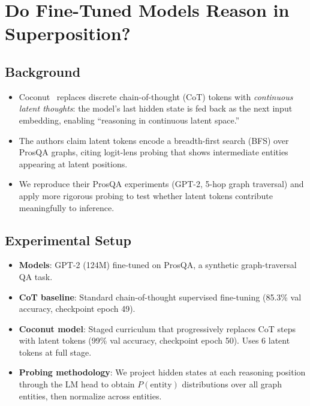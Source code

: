 
\section{Do Fine-Tuned Models Reason in Superposition?}
\label{sec:coconut}

\subsection{Background}
\label{sec:coconut-background}

\begin{itemize}
    \item Coconut~\cite{hao2024coconut} replaces discrete chain-of-thought (CoT) tokens with \emph{continuous latent thoughts}: the model's last hidden state is fed back as the next input embedding, enabling ``reasoning in continuous latent space.''
    \item The authors claim latent tokens encode a breadth-first search (BFS) over ProsQA graphs, citing logit-lens probing that shows intermediate entities appearing at latent positions.
    \item We reproduce their ProsQA experiments (GPT-2, 5-hop graph traversal) and apply more rigorous probing to test whether latent tokens contribute meaningfully to inference.
\end{itemize}

\subsection{Experimental Setup}
\label{sec:coconut-setup}

\begin{itemize}
    \item \textbf{Models}: GPT-2 (124M) fine-tuned on ProsQA, a synthetic graph-traversal QA task.
    \item \textbf{CoT baseline}: Standard chain-of-thought supervised fine-tuning (85.3\% val accuracy, checkpoint epoch 49).
    \item \textbf{Coconut model}: Staged curriculum that progressively replaces CoT steps with latent tokens (99\% val accuracy, checkpoint epoch 50). Uses 6 latent tokens at full stage.
    \item \textbf{Probing methodology}: We project hidden states at each reasoning position through the LM head to obtain $P(\text{entity})$ distributions over all graph entities, then normalize across entities.
\end{itemize}

